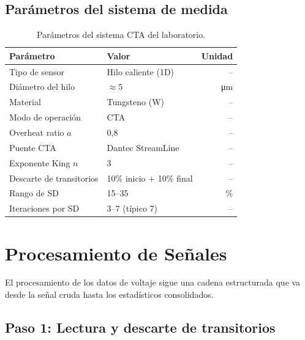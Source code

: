 \documentclass[12pt,a4paper]{article}
\begin{document}
\subsection{Parámetros del sistema de medida}

\begin{table}[H]
	\centering
	\caption{Parámetros del sistema CTA del laboratorio.}
	\label{tab:parametros_CTA}
	\begin{tabular}{llr}
		\toprule
		\textbf{Parámetro}       & \textbf{Valor}             & \textbf{Unidad} \\
		\midrule
		Tipo de sensor           & Hilo caliente (1D)         & --              \\
		Diámetro del hilo        & $\approx 5$                & \si{\micro\m}   \\
		Material                 & Tungsteno (W)              & --              \\
		Modo de operación        & CTA                        & --              \\
		Overheat ratio $a$       & 0,8                        & --              \\
		Puente CTA               & Dantec StreamLine          & --              \\
		Exponente King $n$       & 3                          & --              \\
		Descarte de transitorios & 10\% inicio $+$ 10\% final & --              \\
		Rango de SD              & 15--35                     & \%              \\
		Iteraciones por SD       & 3--7 (típico 7)            & --              \\
		\bottomrule
	\end{tabular}
\end{table}

\section{Procesamiento de Señales}
\label{sec:procesamiento}

El procesamiento de los datos de voltaje sigue una cadena estructurada que
va desde la señal cruda hasta los estadísticos consolidados.

\subsection{Paso 1: Lectura y descarte de transitorios}
\end{document}
